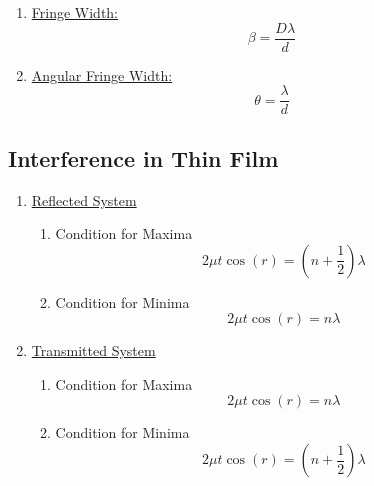 \documentclass[12pt]{article}
\begin{document}
\begin{enumerate}
	\item \underline{Fringe Width:}
	\begin{equation}
		\beta = \frac{D\lambda}{d}
	\end{equation}


	\item \underline{Angular Fringe Width:}
	\begin{equation}
		\theta = \frac{\lambda}{d}
	\end{equation}

	\end{enumerate}


	\subsection{Interference in Thin Film}
	\begin{enumerate}
		\item \underline{Reflected System }
		\begin{enumerate}
			\item Condition for Maxima
			\begin{equation}
				2\mu t \cos(r) = (n + \frac{1}{2}) \lambda
			\end{equation}
			
			\item Condition for Minima
			\begin{equation}
				2\mu t \cos(r) = n \lambda
			\end{equation}
		\end{enumerate}
		\item \underline{Transmitted System} 
		\begin{enumerate}
			\item Condition for Maxima
			\begin{equation}
				2\mu t \cos(r) = n \lambda
			\end{equation}
			\item Condition for Minima
			\begin{equation}
				2\mu t \cos(r) = (n + \frac{1}{2}) \lambda
			\end{equation}
			
		\end{enumerate}
	\end{enumerate}
\end{document}
